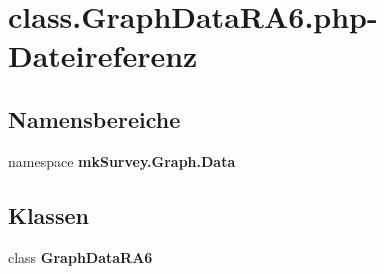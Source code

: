 \section{class.GraphDataRA6.php-Dateireferenz}
\label{class_8GraphDataRA6_8php}
\subsection*{Namensbereiche}
\begin{CompactItemize}
\item 
namespace {\bf mkSurvey.Graph.Data}
\end{CompactItemize}
\subsection*{Klassen}
\begin{CompactItemize}
\item 
class {\bf GraphDataRA6}
\end{CompactItemize}
